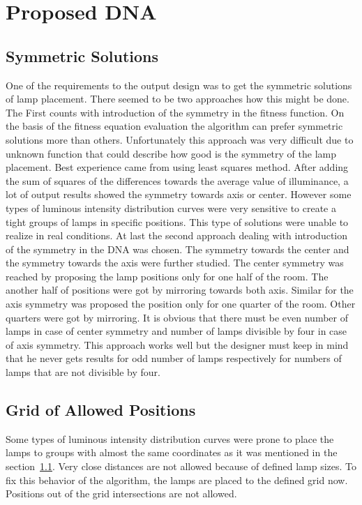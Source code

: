 \section{Proposed DNA}
\subsection{Symmetric Solutions}
\label{ssec:symmetry}
One of the requirements to the output design was to get the symmetric solutions of lamp placement. There seemed to be two approaches how this might be done. The First counts with introduction of the symmetry in the fitness function. On the basis of the fitness equation evaluation the algorithm can prefer symmetric solutions more than others. Unfortunately this approach was very difficult due to unknown function that could describe how good is the symmetry of the lamp placement. Best experience came from using least squares method. After adding the sum of squares of the differences towards the average value of illuminance, a lot of output results showed the symmetry towards axis or center. However some types of luminous intensity distribution curves were very sensitive to create a tight groups of lamps in specific positions. This type of solutions were unable to realize in real conditions.
At last the second approach dealing with introduction of the symmetry in the DNA was chosen. The symmetry towards the center and the symmetry towards the axis were further studied. The center symmetry was reached by proposing the lamp positions only for one half of the room. The another half of positions were got by mirroring towards both axis. Similar for the axis symmetry was proposed the position only for one quarter of the room. Other quarters were got by mirroring. It is obvious that there must be even number of lamps in case of center symmetry and number of lamps divisible by four in case of axis symmetry. This approach works well but the designer must keep in mind that he never gets results for odd number of lamps respectively for numbers of lamps that are not divisible by four.

\subsection{Grid of Allowed Positions}
\label{ssec:grid}
Some types of luminous intensity distribution curves were prone to place the lamps to groups with almost the same coordinates as it was mentioned in the section~\ref{ssec:symmetry}. Very close distances are not allowed because of defined lamp sizes. To fix this behavior of the algorithm, the lamps are placed to the defined grid now. Positions out of the grid intersections are not allowed.


